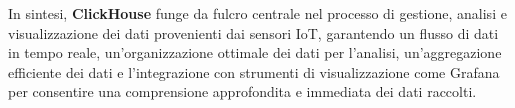 In sintesi, \textbf{ClickHouse} funge da fulcro centrale nel processo di gestione, analisi e visualizzazione dei dati provenienti dai sensori IoT, garantendo un flusso di dati in tempo reale, un'organizzazione ottimale dei dati per l'analisi, un'aggregazione efficiente dei dati e l'integrazione con strumenti di visualizzazione come Grafana per consentire una comprensione approfondita e immediata dei dati raccolti.
